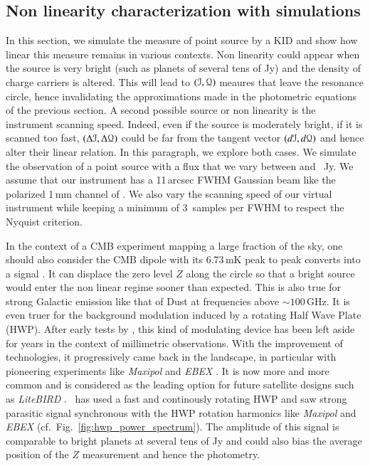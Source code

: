 {%

\subsection{Non linearity characterization with simulations}

In this section, we simulate the measure of point source by a KID and show how
linear this measure remains in various contexts. Non linearity could appear when
the source is very bright (such as planets of several tens of Jy) and the
density of charge carriers is altered. This will lead to $(\mathcal{I},\mathcal{Q})$ meaures that
leave the resonance circle, hence invalidating the approximations made in the
photometric equations of the previous section. A second possible source or non
linearity is the instrument scanning speed. Indeed, even if the source
is moderately bright, if it is scanned too fast, $(\Delta\mathcal{I},\Delta\mathcal{Q})$ could be
far from the tangent vector $(d\mathcal{I},d\mathcal{Q})$ and hence alter their linear
relation. In this paragraph, we explore both cases. We simulate the observation
of a point source with a flux that we vary between  and
~Jy. We assume that our instrument has a 11\,arcsec FWHM Gaussian beam
like the polarized 1\,mm channel of \nikad. We also vary the scanning speed of
our virtual instrument while keeping a minimum of 3~samples per FWHM to respect
the Nyquist criterion.

In the context of a CMB experiment mapping a large fraction of the sky, one
should also consider the CMB dipole with its 6.73\,mK peak to peak  converts into a  signal . It can displace the zero level $Z$ along the circle so that a
bright source would enter the non linear regime sooner than expected. This is
also true for strong Galactic emission like that of Dust at frequencies above
$\sim 100$\,GHz. It is even truer for the background modulation induced by a
rotating Half Wave Plate (HWP). After early tests by , this kind of modulating device has been left aside for
 years in the context of millimetric observations. With the
improvement of technologies, it progressively came back in the landscape, in
particular with pioneering experiments like \emph{Maxipol}
\citep{2007ApJ...665...42J} and \emph{EBEX} \citep{2010SPIE.7741E..1CR}. It is
now more and more common and is considered as the leading option for future
satellite designs such as \emph{LiteBIRD} . \nika\ has used a
fast and continously rotating HWP and saw strong parasitic signal synchronous
with the HWP rotation harmonics \citep{2017A&A...599A..34R} like \emph{Maxipol}
and \emph{EBEX} (cf.~Fig.~\ref{fig:hwp_power_spectrum}). The amplitude of this
signal is comparable to bright planets at several tens of Jy and could also bias
the average position of the $Z$ measurement and hence the photometry.

}







